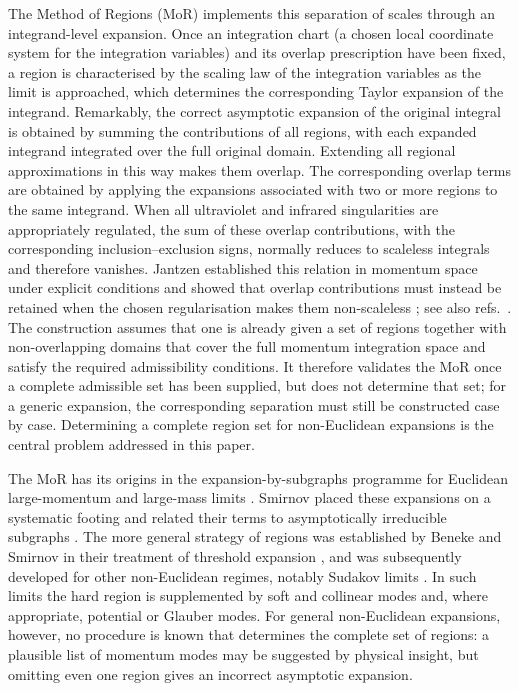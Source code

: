 \documentclass[a4paper,11pt]{article}
\begin{document}
The Method of Regions (MoR) implements this separation of scales through an
integrand-level expansion.  Once an integration chart (a chosen local
coordinate system for the integration variables) and its overlap
prescription have been fixed, a region is characterised by the scaling law of
the integration variables as the limit is approached, which determines the
corresponding Taylor expansion of the integrand.  Remarkably, the
correct asymptotic expansion of the original integral is obtained by summing
the contributions of all regions, with each expanded integrand integrated
over the full original domain.  Extending all regional approximations in
this way makes them overlap.  The corresponding overlap terms
are obtained by applying the expansions associated with two or more regions
to the same integrand.  When all
ultraviolet and infrared singularities are appropriately regulated, the sum
of these overlap contributions, with the corresponding inclusion--exclusion
signs, normally reduces to scaleless integrals and therefore vanishes.
Jantzen established this relation in momentum space under explicit
conditions and showed that overlap contributions must instead be retained
when the chosen regularisation makes them non-scaleless
\cite{Jantzen:2011nz}; see also
refs.~\cite{Smirnov:2002pj,Semenova:2018cwy,Ma25}.  The construction assumes
that one is already given a set of regions together with non-overlapping
domains that cover the full momentum integration space and satisfy the
required admissibility conditions.  It therefore validates the MoR once a
complete admissible set has been supplied, but does not determine that set;
for a generic expansion, the corresponding separation must still be
constructed case by case.  Determining a complete region set for
non-Euclidean expansions is the central problem addressed in this paper.

The MoR has its origins in the expansion-by-subgraphs programme for Euclidean
large-momentum and large-mass limits
\cite{CtkGrshnTch82,Ctk83,GrshnLrnTch83,GrshnLrn87,SmthDVr88,Grshn89}.
Smirnov placed these expansions on a systematic footing and related their
terms to asymptotically irreducible subgraphs
\cite{Smirnov:1990rz,Smirnov:1994tg}.  The more general strategy of regions was
established by Beneke and Smirnov in their treatment of threshold expansion
\cite{Beneke:1997zp}, and was subsequently developed for other non-Euclidean
regimes, notably Sudakov limits
\cite{Smirnov:1998vk,Smirnov:1999bza}.  In such limits the hard
region is supplemented by soft and collinear modes and, where appropriate,
potential or Glauber modes.  For general non-Euclidean expansions, however,
no procedure is known that determines the complete set of regions: a
plausible list of momentum modes may be suggested by physical insight, but
omitting even one region gives an incorrect asymptotic expansion.
\end{document}
